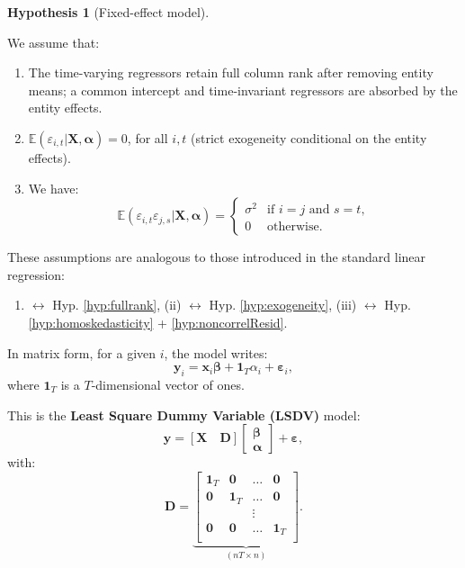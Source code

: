\documentclass[
  11pt,
]{book}
\providecommand{\tightlist}{%
  \setlength{\itemsep}{0pt}\setlength{\parskip}{0pt}}
\theoremstyle{definition}
\theoremstyle{definition}
\theoremstyle{definition}
\theoremstyle{definition}
\newtheorem{hypothesis}{Hypothesis}[chapter]
\theoremstyle{remark}
\begin{document}
\begin{hypothesis}[Fixed-effect model]
\protect\hypertarget{hyp:FE}{}\label{hyp:FE}

We assume that:

\begin{enumerate}
\def\labelenumi{\roman{enumi}.}
\tightlist
\item
  The time-varying regressors retain full column rank after removing entity means; a common intercept and time-invariant regressors are absorbed by the entity effects.
\item
  \(\mathbb{E}(\varepsilon_{i,t}|\mathbf{X},\boldsymbol\alpha)=0\), for all \(i,t\) (strict exogeneity conditional on the entity effects).
\item
  We have:
  \[
  \mathbb{E}(\varepsilon_{i,t}\varepsilon_{j,s}|\mathbf{X},\boldsymbol\alpha) =
  \left\{
  \begin{array}{cl}
  \sigma^2 & \mbox{if $i=j$ and $s=t$},\\
  0 & \mbox{otherwise.}
  \end{array}\right.
  \]
\end{enumerate}

\end{hypothesis}

These assumptions are analogous to those introduced in the standard linear regression:

\begin{enumerate}
\def\labelenumi{(\roman{enumi})}
\tightlist
\item
  \(\leftrightarrow\) Hyp. \ref{hyp:fullrank}, (ii) \(\leftrightarrow\) Hyp. \ref{hyp:exogeneity}, (iii) \(\leftrightarrow\) Hyp. \ref{hyp:homoskedasticity} + \ref{hyp:noncorrelResid}.
\end{enumerate}

In matrix form, for a given \(i\), the model writes:
\[
\mathbf{y}_i = \mathbf{x}_i \boldsymbol\beta + \mathbf{1}_T\alpha_i + \boldsymbol\varepsilon_i,
\]
where \(\mathbf{1}_T\) is a \(T\)-dimensional vector of ones.

This is the \textbf{Least Square Dummy Variable (LSDV)} model:
\begin{equation}
\mathbf{y} = [\mathbf{X} \quad \mathbf{D}]
\left[
\begin{array}{c}
\boldsymbol\beta\\
\boldsymbol\alpha
\end{array}
\right]
+ \boldsymbol\varepsilon, \label{eq:LSDV}
\end{equation}
with:
\[
\mathbf{D} = \underbrace{ \left[\begin{array}{cccc}
\mathbf{1}_T&\mathbf{0}&\dots&\mathbf{0}\\
\mathbf{0}&\mathbf{1}_T&\dots&\mathbf{0}\\
&&\vdots&\\
\mathbf{0}&\mathbf{0}&\dots&\mathbf{1}_T\\
\end{array}\right]}_{(nT \times n)}.
\]
\end{document}
